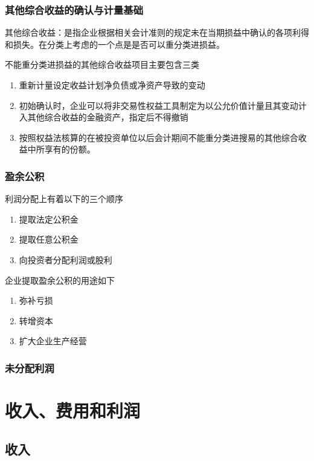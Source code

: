 \documentclass[UTF8,12pt]{ctexart}
\numberwithin{equation}{section} %
\numberwithin{figure}{section}
\numberwithin{table}{section}
\begin{document}
	\subsubsection{其他综合收益的确认与计量基础}
	其他综合收益：是指企业根据相关会计准则的规定未在当期损益中确认的各项利得和损失。在分类上考虑的一个点是是否可以重分类进损益。
	
	不能重分类进损益的其他综合收益项目主要包含三类
	\begin{enumerate}
		\item 重新计量设定收益计划净负债或净资产导致的变动
		
		\item 初始确认时，企业可以将非交易性权益工具制定为以公允价值计量且其变动计入其他综合收益的金融资产，指定后不得撤销
		
		\item 按照权益法核算的在被投资单位以后会计期间不能重分类进搜易的其他综合收益中所享有的份额。
	\end{enumerate}
	\subsubsection{盈余公积}
	利润分配上有着以下的三个顺序
	\begin{enumerate}
		\item 提取法定公积金
		
		\item 提取任意公积金
		
		\item 向投资者分配利润或股利
	\end{enumerate}

	企业提取盈余公积的用途如下
	\begin{enumerate}
		\item 弥补亏损
		
		\item 转增资本
		
		\item 扩大企业生产经营
	\end{enumerate}
	\subsubsection{未分配利润}
	
	
	\newpage
	\section{收入、费用和利润}
	\subsection{收入}
\end{document}
